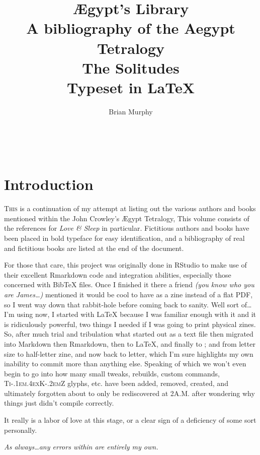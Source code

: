 \documentclass[10pt,makeidx]{extreport}
\author{Brian Murphy}
\title{
 {\Huge Ægypt's Library} \\
 {\footnotesize A bibliography of the Aegypt Tetralogy \\
 \bigskip
 {\Large The Solitudes} \\
 \bigskip
 Typeset in \LaTeX{} \\
 }
}
\date{\begin{small}\today{}\end{small}}
\newcommand\blankpage{%
    \null
    \thispagestyle{empty}%
    \addtocounter{page}{-1}%
    \newpage%
    \pagestyle{fancy}}
\newcommand{\tikzlogo}{%
  \textsc{Ti\kern-.1em\lower.4ex\hbox{K}\kern-.2emZ}\xspace
}
\newcommand\nbvspace[1][3]{\vspace*{\stretch{#1}}}
\newcommand{\chapterzodiac}[2]{%
  \chapter[\texorpdfstring{#2}{#2}]{%
    \color{Mahogany}\bfseries
    #2%
    \hfill
    {\shadowtext{{\color{Mahogany}\Huge\Zodiac{#1}}}}%
  }%
}
\begin{document}




\setcounter{tocdepth}{2}
\tableofcontents

\begin{center}
\vfill
\shadowoffset{1pt}
\shadowtext{%
{\color{Mahogany}\fontsize{50}{54}\Saturn}}\\
\nbvspace[1]
\end{center}

\pagestyle{fancy}
\chapterzodiac{12}{Introduction}
\lettrine[lines=4,findent=3pt]{T}{his} is a continuation of my attempt at listing out the various authors and books mentioned within the John Crowley's Ægypt Tetralogy, This volume consists of the references for \textit{Love \& Sleep} in particular. Fictitious authors and books have been placed in bold typeface for easy identification, and a bibliography of real and fictitious books are listed at the end of the document.

For those that care, this project was originally done in RStudio to make use of their excellent Rmarkdown code and integration abilities, especially those concerned with BibTeX files. Once I finished it there a friend \textit{(you know who you are James\ldots)} mentioned it would be cool to have as a zine instead of a flat PDF, so I went way down that rabbit-hole before coming back to sanity. Well sort of\dots I'm using  now, I started with \LaTeX{} because I was familiar enough with it and it is ridiculously powerful, two things I needed if I was going to print physical zines. So, after much trial and tribulation what started out as a text file then migrated into Markdown then Rmarkdown, then to \LaTeX{}, and finally to ; and from letter size to half-letter zine, and now back to letter, which I'm sure highlights my own inability to commit more than anything else. Speaking of which we won't even begin to go into how many small tweaks, rebuilds, custom commands, \tikzlogo glyphs, etc. have been added, removed, created, and ultimately forgotten about to only be rediscovered at 2\textsc{A.M.} after wondering why things just didn't compile correctly. 

It really is a labor of love at this stage, or a clear sign of a deficiency of some sort personally.

\vspace*{1cm}

\begin{center}
	\textit{As always\ldots any errors within are entirely my own.}
\end{center}
\end{document}
